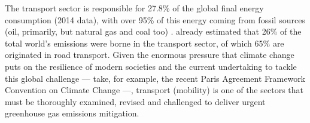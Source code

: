 The transport sector is responsible for 27.8\% of the global final energy consumption (2014 data), with over 95\% of this energy coming from fossil sources (oil, primarily, but natural gas and coal too) \parencite{iea2017_Statisticswebportal}. \textcite{chapman2007_Transportclimatechange} already estimated that 26\% of the total world's  emissions were borne in the transport sector, of which 65\% are originated in road transport. Given the enormous pressure that climate change puts on the resilience of modern societies \parencite{ipcc2014_ClimateChange2014} and the current undertaking to tackle this global challenge --- take, for example, the recent Paris Agreement Framework Convention on Climate Change \parencite{clemencon2016_TwoSidesParis} ---, transport (mobility) is one of the sectors that must be thoroughly examined, revised and challenged to deliver urgent greenhouse gas emissions mitigation.

%
%
